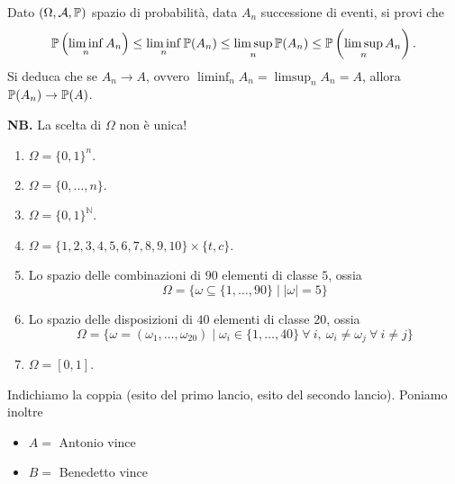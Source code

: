 Dato $( \Omega ,\mathcal{A} ,\P)$ spazio di probabilità, data $A_{n}$ successione di eventi, si provi che
\begin{equation*}
\P\left(\liminf _{n} A_{n}\right) \leq \liminf _{n}\P( A_{n}) \leq \limsup _{n}\P( A_{n})\leq \mathbb{P}\left(\limsup _{n} A_{n}\right) .
\end{equation*}
Si deduca che se $A_{n}\rightarrow A$, ovvero $\liminf\nolimits _{n} A_{n} =\limsup _{n} A_{n} =A$, allora $\P( A_{n})\rightarrow \P( A)$.



\ParteSoluzioni










\Soluzione

\textbf{NB.} La scelta di $\Omega $ non è unica!
\begin{enumerate}
\item $\Omega =\{0,1\}^{n} .$
\item $\Omega =\{0,\dotsc ,n\}$.
\item $\Omega =\{0,1\}^{\mathbb{N}}$.
\item $\Omega =\{1,2,3,4,5,6,7,8,9,10\} \times \{t,c\}$.
\item Lo spazio delle combinazioni di $90$ elementi di classe $5$, ossia\begin{equation*}
\Omega =\{\omega \subseteq \{1,\dotsc ,90\} \mid |\omega |=5\}
\end{equation*}
\item Lo spazio delle disposizioni di $40$ elementi di classe $20$, ossia\begin{equation*}
\Omega =\{\omega =( \omega _{1} ,\dotsc ,\omega _{20}) \mid \omega _{i} \in \{1,\dotsc ,40\} \ \forall \ i,\ \omega _{i} \neq \omega _{j} \ \forall \ i\neq j\}
\end{equation*}
\item $\Omega =[ 0,1]$.
\end{enumerate}
\Soluzione

Indichiamo la coppia (esito del primo lancio, esito del secondo lancio). Poniamo inoltre
\begin{itemize}
\item $A=$ Antonio vince
\item $B=$ Benedetto vince
\end{itemize}

